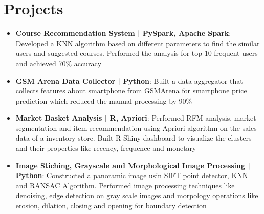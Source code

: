 \documentclass[a4paper,30pt]{article}
\newcommand{\resumeItem}[2]{
  \item\normalsize{
    \textbf{#1}{: #2 \vspace{-2pt}}
  }
}
\newcommand{\resumeSubItem}[2]{\resumeItem{#1}{#2}\vspace{-3pt}}
\newcommand{\resumeSubHeadingListStart}{\begin{itemize}[leftmargin=*]}
\newcommand{\resumeSubHeadingListEnd}{\end{itemize}}
\begin{document}
\vspace{-5pt}


\section{Projects}
\resumeSubHeadingListStart
\vspace{2pt}
\resumeSubItem{Course Recommendation System | PySpark, Apache Spark}{Developed a KNN algorithm based on different parameters to find the similar users and suggested courses. Performed the analysis for top 10 frequent users and achieved 70\% accuracy}
\vspace{2pt}
\resumeSubItem{GSM Arena Data Collector | Python}{Built a data aggregator that collects features about smartphone from GSMArena for smartphone price prediction which reduced the manual processing by 90\%}
\vspace{2pt}
\resumeSubItem{Market Basket Analysis | R, Apriori}{Performed RFM analysis, market segmentation and item recommendation using Apriori algorithm on the sales data of a inventory store. Built R Shiny dashboard to visualize the clusters and their properties like recency, frequence and monetary }
\vspace{2pt}
\resumeSubItem{Image Stiching, Grayscale and Morphological Image Processing | Python}{Constructed a panoramic image usin SIFT point detector, KNN and RANSAC Algorithm. Performed image processing techniques like denoising, edge detection on gray scale images and morpology operations like erosion, dilation, closing and opening for boundary detection}
\vspace{2pt}
\resumeSubHeadingListEnd
\end{document}
